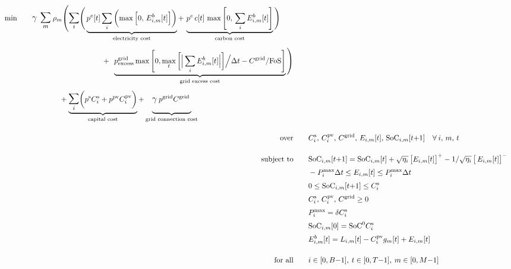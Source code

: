 \begin{subequations} \label{eq:districts-SP}
    \begin{align}
        \addtocounter{equation}{-1}
        \begin{split}
        \text{min} & \qquad \mathlarger{\gamma} \:\: \mathlarger{\mathlarger{\sum}}_m \: \rho_m \vast( \mathlarger{\sum}_t \Bigg( \underbrace{p^e[t] \sum_i \left( \max \left[ 0,\, E_{i,m}^b[t] \right] \right)}_{\text{electricity cost}} + \, \underbrace{p^c \, c[t] \, \max \Bigg[ 0,\, \sum_i E_{i,m}^b[t] \Bigg]}_{\text{carbon cost}} \Bigg) \\[1ex]
        & \hspace{4cm} + \:\: \underbrace{p^{\textrm{grid}}_{\textrm{excess}} \max \Bigg[0, \max_t \bigg[ \Big| \sum_i E_{i,m}^b[t] \Big| \bigg]\Big/\Delta t - C^{\textrm{grid}}/\text{FoS} \Bigg]}_{\text{grid excess cost}} \vast)\\[1ex]
        & \hspace{2cm} + \underbrace{\mathlarger{\mathlarger{\sum}}_i \bigg( p^{\textrm{s}} C^{\textrm{s}}_i + p^{\textrm{pv}} C^{\textrm{pv}}_i \bigg)}_{\text{capital cost}} + \underbrace{\vphantom{\mathlarger{\sum}_i} \mathlarger{\gamma} \: p^{\textrm{grid}} C^{\textrm{grid}} \:}_{\text{grid connection cost}}
        \end{split} \label{eq:districts-lp} \\[\eqnskip]%
        \text{over} & \qquad C^{\textrm{s}}_i,\, C^{\textrm{pv}}_i,\, C^{\textrm{grid}},\, E_{i,m}[t],\, \textrm{SoC}_{i,m}[t{+}1] \quad \forall \: i,\, m,\, t \tag*{} \\[\eqnskip]
        \text{subject to} & \qquad \textrm{SoC}_{i,m}[t{+}1] = \textrm{SoC}_{i,m}[t] + \sqrt{\eta_i} \left[E_{i,m}[t]\right]^{+} - 1/\sqrt{\eta_i} \left[\, E_{i,m}[t] \right]^{-} \label{eq:districts-dynamics-constraint} \\[\smalleqnskip]
        & \qquad -P^{\textrm{max}}_i \Delta t \leq E_{i,m}[t] \leq P^{\textrm{max}}_i \Delta t \label{eq:districts-power-constraint} \\[\smalleqnskip]
        & \qquad 0 \leq \textrm{SoC}_{i,m}[t{+}1] \leq C^{\textrm{s}}_i \label{eq:districts-energy-constraint} \\[\smalleqnskip]
        & \qquad C^{\textrm{s}}_i,\, C^{\textrm{pv}}_i,\, C^{\textrm{grid}} \geq 0 \\[\smalleqnskip]
        & \qquad P^{\textrm{max}}_i = \delta C^{\textrm{s}}_i \label{eq:districts-power-capacity} \\[\smalleqnskip]
        & \qquad \textrm{SoC}_{i,m}[0] = \textrm{SoC}^0 C^{\textrm{s}}_i \label{eq:districts-initial-conditions} \\[\smalleqnskip]
        & \qquad E^b_{i,m}[t] = L_{i,m}[t] - C^{\textrm{pv}}_i g_m[t] + E_{i,m}[t] \label{eq:districts-aggregation-constraint} \\[\eqnskip]%
        \text{for all} & \qquad i \in [0,B{-}1], \: t \in [0,T{-}1], \: m \in [0,M{-}1] \tag*{}
    \end{align}
\end{subequations}

